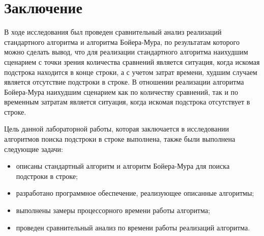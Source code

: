 \chapter*{Заключение}

В ходе исследования был проведен сравнительный анализ реализаций стандартного алгоритма и
алгоритма Бойера-Мура, по результатам которого можно сделать вывод, что для реализации
стандартного алгоритма наихудшим сценарием с точки зрения количества 
сравнений является ситуация, когда искомая подстрока находится в конце 
строки, а с учетом затрат времени, худшим случаем является отсутствие подстроки 
в строке. В отношении реализации алгоритма Бойера-Мура наихудшим сценарием как по 
количеству сравнений, так и по временным затратам является ситуация, когда 
искомая подстрока отсутствует в строке. 

Цель данной лабораторной работы, которая заключается в исследовании алгоритмов поиска подстроки в строке выполнена, 
также были выполнена следующие задачи:
\begin{itemize}
    \item описаны стандартный алгоритм и алгоритм Бойера-Мура для поиска подстроки в строке;
    \item разработано программное обеспечение, реализующее описанные алгоритмы;
    \item выполнены замеры процессорного времени работы алгоритма;
	\item проведен сравнительный анализ по времени работы реализаций алгоритма.
\end{itemize}
